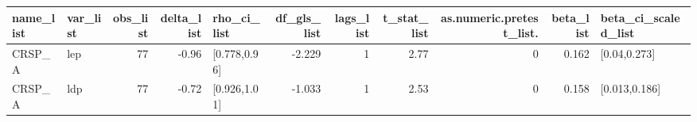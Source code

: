 \begin{table}[ht]
\centering
\begin{tabular}{llrrlrrrrrl}
  \hline
name\_list & var\_list & obs\_list & delta\_list & rho\_ci\_list & df\_gls\_list & lags\_list & t\_stat\_list & as.numeric.pretest\_list. & beta\_list & beta\_ci\_scaled\_list \\ 
  \hline
CRSP\_A & lep & 77 & -0.96 & [0.778,0.96] & -2.229 & 1 & 2.77 & 0 & 0.162 & [0.04,0.273] \\ 
  CRSP\_A & ldp & 77 & -0.72 & [0.926,1.01] & -1.033 & 1 & 2.53 & 0 & 0.158 & [0.013,0.186] \\ 
   \hline
\end{tabular}
\end{table}
